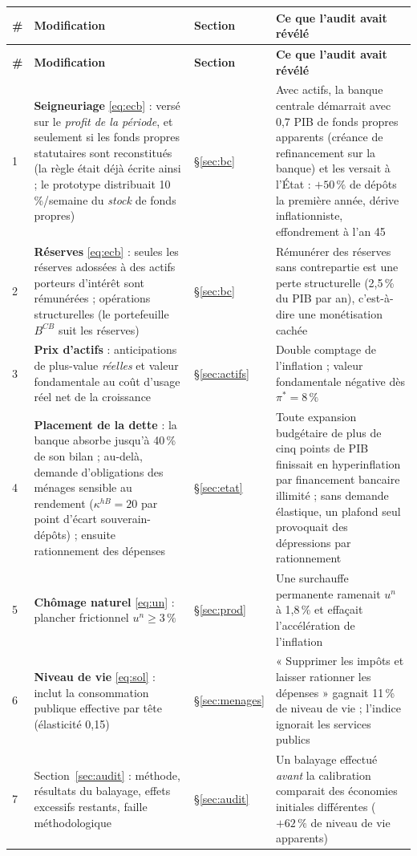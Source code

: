\documentclass[11pt,a4paper]{article}
\begin{document}
\begin{center}\small
\begin{longtable}{p{0.5cm}p{6.6cm}p{2.1cm}p{5.8cm}}
\toprule
\textbf{\#} & \textbf{Modification} & \textbf{Section} & \textbf{Ce que l'audit avait révélé}\\
\midrule
\endfirsthead
\toprule
\textbf{\#} & \textbf{Modification} & \textbf{Section} & \textbf{Ce que l'audit avait révélé}\\
\midrule
\endhead
1 & \textbf{Seigneuriage} \eqref{eq:ecb} : versé sur le \emph{profit de la période}, et seulement si les fonds propres statutaires sont reconstitués (la règle était déjà écrite ainsi ; le prototype distribuait 10\,\%/semaine du \emph{stock} de fonds propres) & \S\ref{sec:bc} & Avec actifs, la banque centrale démarrait avec 0,7 PIB de fonds propres apparents (créance de refinancement sur la banque) et les versait à l'État : $+50\,\%$ de dépôts la première année, dérive inflationniste, effondrement à l'an 45\\
2 & \textbf{Réserves} \eqref{eq:ecb} : seules les réserves adossées à des actifs porteurs d'intérêt sont rémunérées ; opérations structurelles (le portefeuille $B^{CB}$ suit les réserves) & \S\ref{sec:bc} & Rémunérer des réserves sans contrepartie est une perte structurelle (2,5\,\% du PIB par an), c'est-à-dire une monétisation cachée\\
3 & \textbf{Prix d'actifs} : anticipations de plus-value \emph{réelles} et valeur fondamentale au coût d'usage réel net de la croissance & \S\ref{sec:actifs} & Double comptage de l'inflation ; valeur fondamentale négative dès $\pi^\ast=8\,\%$\\
4 & \textbf{Placement de la dette} : la banque absorbe jusqu'à 40\,\% de son bilan ; au-delà, demande d'obligations des ménages sensible au rendement ($\kappa^{hB}=20$ par point d'écart souverain-dépôts) ; ensuite rationnement des dépenses & \S\ref{sec:etat} & Toute expansion budgétaire de plus de cinq points de PIB finissait en hyperinflation par financement bancaire illimité ; sans demande élastique, un plafond seul provoquait des dépressions par rationnement\\
5 & \textbf{Chômage naturel} \eqref{eq:un} : plancher frictionnel $u^n\ge3\,\%$ & \S\ref{sec:prod} & Une surchauffe permanente ramenait $u^n$ à 1,8\,\% et effaçait l'accélération de l'inflation\\
6 & \textbf{Niveau de vie} \eqref{eq:sol} : inclut la consommation publique effective par tête (élasticité 0,15) & \S\ref{sec:menages} & « Supprimer les impôts et laisser rationner les dépenses » gagnait 11\,\% de niveau de vie ; l'indice ignorait les services publics\\
7 & Section~\ref{sec:audit} : méthode, résultats du balayage, effets excessifs restants, faille méthodologique & \S\ref{sec:audit} & Un balayage effectué \emph{avant} la calibration comparait des économies initiales différentes ($+62\,\%$ de niveau de vie apparents)\\
\bottomrule
\end{longtable}
\end{center}
\end{document}
